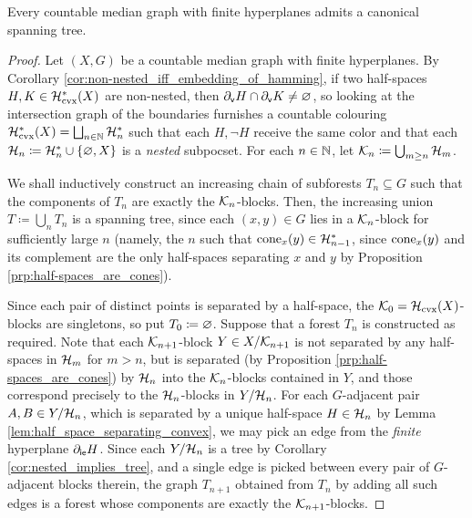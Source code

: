 \documentclass[reqno]{amsart}
\begin{document}
    \begin{proposition}\label{prp:canonical_spanning_trees}
        Every countable median graph with finite hyperplanes admits a canonical spanning tree.
    \end{proposition}
    \begin{proof}
        Let $(X,G)$ be a countable median graph with finite hyperplanes. By Corollary \ref{cor:non-nested_iff_embedding_of_hamming}, if two half-spaces $H,K\in\mc{H}^\ast_\mathrm{cvx}(X)$ are non-nested, then $\del_\mathsf{v}H\cap\del_\mathsf{v}K\neq\em$, so looking at the intersection graph of the boundaries furnishes a countable colouring $\mc{H}^\ast_\mathrm{cvx}(X)=\bigsqcup_{n\in\N}\mc{H}^\ast_n$ such that each $H,\lnot H$ receive the same color and that each $\mc{H}_n\coloneqq\mc{H}_n^\ast\cup\l\{\em,X\r\}$ is a \textit{nested} subpocset. For each $n\in\N$, let $\mc{K}_n\coloneqq\bigcup_{m\geq n}\mc{H}_m$.

        We shall inductively construct an increasing chain of subforests $T_n\subseteq G$ such that the components of $T_n$ are exactly the $\mc{K}_n$-blocks. Then, the increasing union $T\coloneqq\bigcup_nT_n$ is a spanning tree, since each $(x,y)\in G$ lies in a $\mc{K}_n$-block for sufficiently large $n$ (namely, the $n$ such that $\cone_x(y)\in\mc{H}^\ast_{n-1}$, since $\cone_x(y)$ and its complement are the only half-spaces separating $x$ and $y$ by Proposition \ref{prp:half-spaces_are_cones}).

        Since each pair of distinct points is separated by a half-space, the $\mc{K}_0=\mc{H}_\mathrm{cvx}(X)$-blocks are singletons, so put $T_0\coloneqq\em$. Suppose that a forest $T_n$ is constructed as required. Note that each $\mc{K}_{n+1}$-block $Y\in X/\mc{K}_{n+1}$ is not separated by any half-spaces in $\mc{H}_m$ for $m>n$, but is separated (by Proposition \ref{prp:half-spaces_are_cones}) by $\mc{H}_n$ into the $\mc{K}_n$-blocks contained in $Y$, and those correspond precisely to the $\mc{H}_n$-blocks in $Y/\mc{H}_n$. For each $G$-adjacent pair $A,B\in Y/\mc{H}_n$, which is separated by a unique half-space $H\in\mc{H}_n$ by Lemma \ref{lem:half_space_separating_convex}, we may pick an edge from the \textit{finite} hyperplane $\del_\mathsf{ie}H$. Since each $Y/\mc{H}_n$ is a tree by Corollary \ref{cor:nested_implies_tree}, and a single edge is picked between every pair of $G$-adjacent blocks therein, the graph $T_{n+1}$ obtained from $T_n$ by adding all such edges is a forest whose components are exactly the $\mc{K}_{n+1}$-blocks.
    \end{proof}
\end{document}
